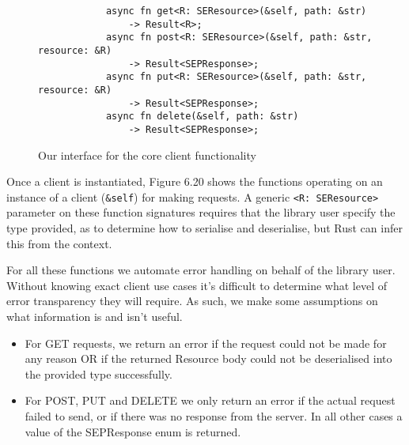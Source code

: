 \begin{figure}[h]
    \begin{center}
        \begin{lstlisting}
            async fn get<R: SEResource>(&self, path: &str) 
                -> Result<R>;
            async fn post<R: SEResource>(&self, path: &str, resource: &R) 
                -> Result<SEPResponse>;
            async fn put<R: SEResource>(&self, path: &str, resource: &R) 
                -> Result<SEPResponse>;
            async fn delete(&self, path: &str) 
                -> Result<SEPResponse>;
        \end{lstlisting}
        \label{fig:clientrequestinterface}
        \vspace{-10pt}
        \caption{Our interface for the core client functionality}
    \end{center}
\end{figure}

Once a client is instantiated, Figure 6.20 shows the functions operating on an instance of a client (\texttt{\&self}) for making requests. A generic \texttt{<R: SEResource>} parameter on these function signatures requires that the library user specify the type provided, as to determine how to serialise and deserialise, but Rust can infer this from the context. 

For all these functions we automate error handling on behalf of the library user. Without knowing exact client use cases it's difficult to determine what level of error transparency they will require. As such, we make some assumptions on what information is and isn't useful.

\begin{itemize}
    \item For GET requests, we return an error if the request could not be made for any reason OR if the returned Resource body could not be deserialised into the provided type successfully.
    \item For POST, PUT and DELETE we only return an error if the actual request failed to send, or if there was no response from the server. In all other cases a value of the SEPResponse enum is returned.
\end{itemize}

